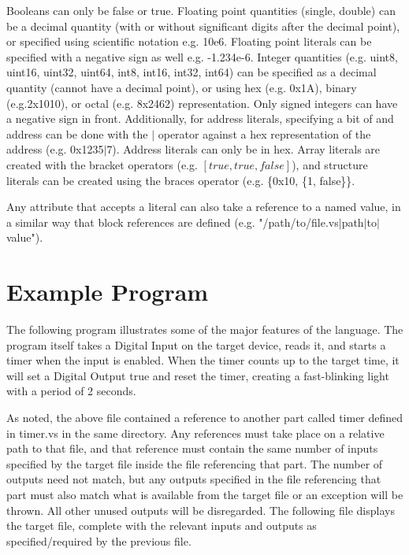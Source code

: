 Booleans can only be false or true. Floating point quantities (single, double) can
be a decimal quantity (with or without significant digits after the decimal point),
or specified using scientific notation e.g. 10e6. Floating point literals can be
specified with a negative sign as well e.g. -1.234e-6. Integer quantities (e.g.
uint8, uint16, uint32, uint64, int8, int16, int32, int64) can be specified as a
decimal quantity (cannot have a decimal point), or using hex (e.g. 0x1A), binary
(e.g.2x1010), or octal (e.g. 8x2462) representation. Only signed integers can have
a negative sign in front. Additionally, for address literals, specifying a bit of
and address can be done with the $\vert$ operator against a hex representation of
the address (e.g. 0x1235$\vert$7). Address literals can only be in hex. Array
literals are created with the bracket operators (e.g. $[true, true, false]$), and
structure literals can be created using the braces operator (e.g. \{0x10, \{1, false\}\}.

Any attribute that accepts a literal can also take a reference to a named value,
in a similar way that block references are defined (e.g. "/path/to/file.vs$\vert$path$\vert$to$\vert$value").

\section{Example Program}

The following program illustrates some of the major features of the language. The
program itself takes a Digital Input on the target device, reads it, and starts a
timer when the input is enabled. When the timer counts up to the target time, it
will set a Digital Output true and reset the timer, creating a fast-blinking light
with a period of 2 seconds.


As noted, the above file contained a reference to another part called timer defined
in timer.vs in the same directory. Any references must take place on a relative path
to that file, and that reference must contain the same number of inputs specified by
the target file inside the file referencing that part. The number of outputs need
not match, but any outputs specified in the file referencing that part must also
match what is available from the target file or an exception will be thrown. All
other unused outputs will be disregarded. The following file displays the target
file, complete with the relevant inputs and outputs as specified/required by the
previous file.

